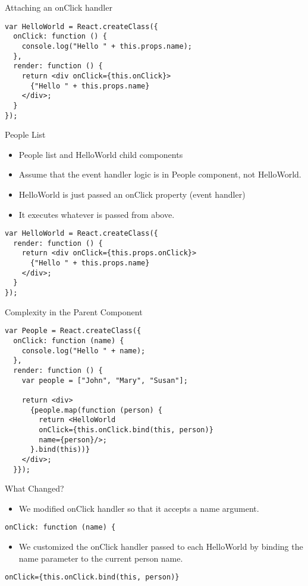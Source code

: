 \documentclass[presentation]{beamer}
\begin{document}
\begin{frame}[fragile,label={sec:orgheadline8}]{Attaching an onClick handler}
 \begin{verbatim}
var HelloWorld = React.createClass({
  onClick: function () {
    console.log("Hello " + this.props.name);
  },
  render: function () {
    return <div onClick={this.onClick}>
      {"Hello " + this.props.name}
    </div>;
  }
});
\end{verbatim}
\end{frame}

\begin{frame}[fragile,label={sec:orgheadline9}]{People List}
 \begin{itemize}
\item People list and HelloWorld child components
\item Assume that the event handler logic is in People component, not HelloWorld.
\item HelloWorld is just passed an onClick property (event handler)
\item It executes whatever is passed from above.
\end{itemize}

\begin{verbatim}
var HelloWorld = React.createClass({
  render: function () {
    return <div onClick={this.props.onClick}>
      {"Hello " + this.props.name}
    </div>;
  }
});
\end{verbatim}
\end{frame}

\begin{frame}[fragile,label={sec:orgheadline10}]{Complexity in the Parent Component}
 \begin{verbatim}
var People = React.createClass({
  onClick: function (name) {
    console.log("Hello " + name);
  },
  render: function () {
    var people = ["John", "Mary", "Susan"];

    return <div>
      {people.map(function (person) {
        return <HelloWorld
        onClick={this.onClick.bind(this, person)}
        name={person}/>;
      }.bind(this))}
    </div>;
  }});
\end{verbatim}
\end{frame}

\begin{frame}[fragile,label={sec:orgheadline11}]{What Changed?}
 \begin{itemize}
\item We modified onClick handler so that it accepts a name argument.
\end{itemize}
\begin{verbatim}
onClick: function (name) {
\end{verbatim}

\begin{itemize}
\item We customized the onClick handler passed to each HelloWorld by binding the
name parameter to the current person name.
\end{itemize}
\begin{verbatim}
onClick={this.onClick.bind(this, person)}
\end{verbatim}
\end{frame}
\end{document}
